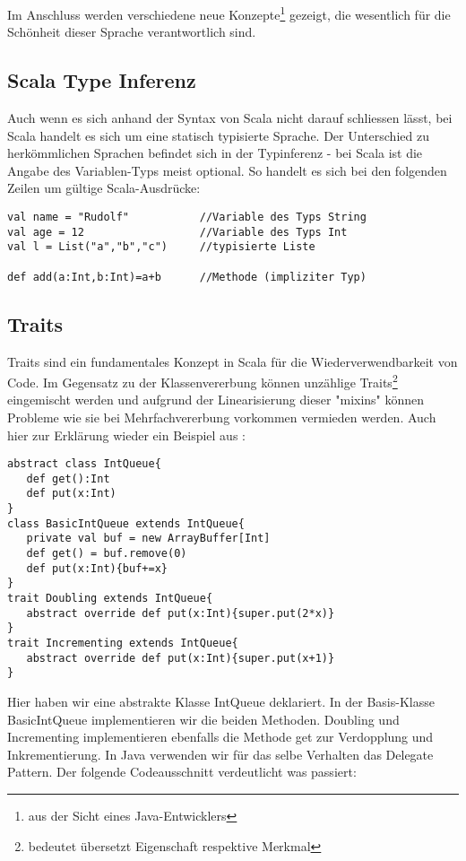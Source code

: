 Im Anschluss werden verschiedene neue Konzepte\footnote{aus der Sicht eines Java-Entwicklers} gezeigt, die wesentlich f\"ur die Sch\"onheit dieser Sprache verantwortlich sind.
\subsection{Scala Type Inferenz}
Auch wenn es sich anhand der Syntax von Scala nicht darauf schliessen l\"asst, bei Scala handelt es sich um eine statisch typisierte Sprache. Der Unterschied zu herk\"ommlichen Sprachen befindet sich in der Typinferenz - bei Scala ist die Angabe des Variablen-Typs meist optional. So handelt es sich bei den folgenden Zeilen um g\"ultige Scala-Ausdr\"ucke:

\begin{lstlisting}[caption=Typeinferenz in Scala]
val name = "Rudolf"           //Variable des Typs String
val age = 12                  //Variable des Typs Int
val l = List("a","b","c")     //typisierte Liste

def add(a:Int,b:Int)=a+b      //Methode (impliziter Typ)
\end{lstlisting}
\subsection{Traits}
Traits sind ein fundamentales Konzept in Scala f\"ur die Wiederverwendbarkeit von Code. Im Gegensatz zu der Klassenvererbung k\"onnen unz\"ahlige Traits\footnote{bedeutet \"ubersetzt Eigenschaft respektive Merkmal} eingemischt werden und aufgrund der Linearisierung dieser "mixins" k\"onnen Probleme wie sie bei Mehrfachvererbung vorkommen vermieden werden. Auch hier zur Erkl\"arung wieder ein Beispiel aus \cite[p. 222-227]{odersky2008programming}:

\begin{lstlisting}[caption=Klassen und Traits definieren]
abstract class IntQueue{
   def get():Int
   def put(x:Int)
}
class BasicIntQueue extends IntQueue{
   private val buf = new ArrayBuffer[Int]
   def get() = buf.remove(0)
   def put(x:Int){buf+=x}
}
trait Doubling extends IntQueue{
   abstract override def put(x:Int){super.put(2*x)}
}
trait Incrementing extends IntQueue{
   abstract override def put(x:Int){super.put(x+1)}
}
\end{lstlisting}
Hier haben wir eine abstrakte Klasse IntQueue deklariert. In der Basis-Klasse BasicIntQueue implementieren wir die beiden Methoden. Doubling und Incrementing implementieren ebenfalls die Methode get zur Verdopplung und Inkrementierung. In Java verwenden wir f\"ur das selbe Verhalten das Delegate Pattern. Der folgende Codeausschnitt verdeutlicht was passiert: 

